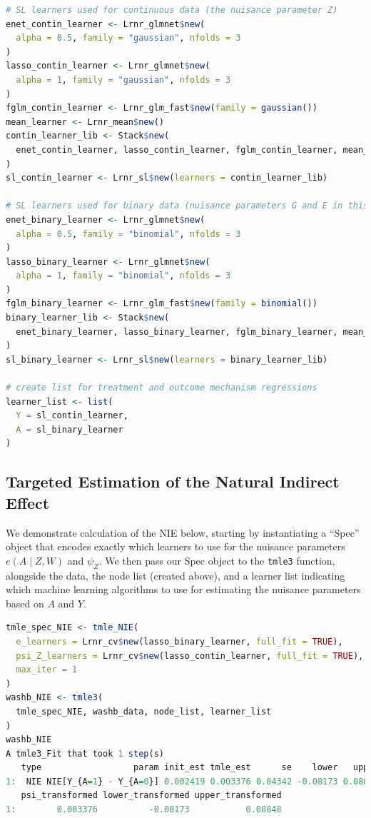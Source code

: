 \documentclass[
  12pt, krantz2,
]{krantz}
\newcommand{\passthrough}[1]{#1}
\newcommand{\1}{\mathbbm{1}}
\theoremstyle{definition}
\theoremstyle{definition}
\theoremstyle{definition}
\theoremstyle{definition}
\theoremstyle{remark}
\begin{document}
\begin{lstlisting}[language=R]
# SL learners used for continuous data (the nuisance parameter Z)
enet_contin_learner <- Lrnr_glmnet$new(
  alpha = 0.5, family = "gaussian", nfolds = 3
)
lasso_contin_learner <- Lrnr_glmnet$new(
  alpha = 1, family = "gaussian", nfolds = 3
)
fglm_contin_learner <- Lrnr_glm_fast$new(family = gaussian())
mean_learner <- Lrnr_mean$new()
contin_learner_lib <- Stack$new(
  enet_contin_learner, lasso_contin_learner, fglm_contin_learner, mean_learner
)
sl_contin_learner <- Lrnr_sl$new(learners = contin_learner_lib)

# SL learners used for binary data (nuisance parameters G and E in this case)
enet_binary_learner <- Lrnr_glmnet$new(
  alpha = 0.5, family = "binomial", nfolds = 3
)
lasso_binary_learner <- Lrnr_glmnet$new(
  alpha = 1, family = "binomial", nfolds = 3
)
fglm_binary_learner <- Lrnr_glm_fast$new(family = binomial())
binary_learner_lib <- Stack$new(
  enet_binary_learner, lasso_binary_learner, fglm_binary_learner, mean_learner
)
sl_binary_learner <- Lrnr_sl$new(learners = binary_learner_lib)

# create list for treatment and outcome mechanism regressions
learner_list <- list(
  Y = sl_contin_learner,
  A = sl_binary_learner
)
\end{lstlisting}

\hypertarget{targeted-estimation-of-the-natural-indirect-effect}{%
\subsection{Targeted Estimation of the Natural Indirect Effect}\label{targeted-estimation-of-the-natural-indirect-effect}}

We demonstrate calculation of the NIE below, starting by instantiating a ``Spec''
object that encodes exactly which learners to use for the nuisance parameters
\(e(A \mid Z, W)\) and \(\psi_Z\). We then pass our Spec object to the \passthrough{\lstinline!tmle3!}
function, alongside the data, the node list (created above), and a learner list
indicating which machine learning algorithms to use for estimating the nuisance
parameters based on \(A\) and \(Y\).

\begin{lstlisting}[language=R]
tmle_spec_NIE <- tmle_NIE(
  e_learners = Lrnr_cv$new(lasso_binary_learner, full_fit = TRUE),
  psi_Z_learners = Lrnr_cv$new(lasso_contin_learner, full_fit = TRUE),
  max_iter = 1
)
washb_NIE <- tmle3(
  tmle_spec_NIE, washb_data, node_list, learner_list
)
washb_NIE
A tmle3_Fit that took 1 step(s)
   type                  param init_est tmle_est      se    lower   upper
1:  NIE NIE[Y_{A=1} - Y_{A=0}] 0.002419 0.003376 0.04342 -0.08173 0.08848
   psi_transformed lower_transformed upper_transformed
1:        0.003376          -0.08173           0.08848
\end{lstlisting}
\end{document}
